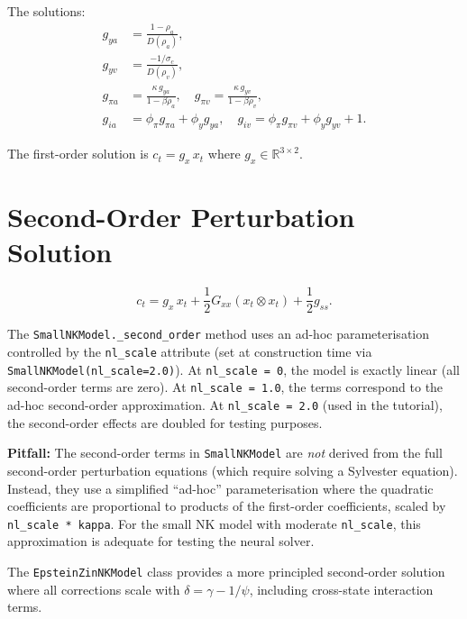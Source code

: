 \documentclass[11pt,a4paper]{article}
\theoremstyle{definition}
\newcommand{\R}{\mathbb{R}}
\newcommand{\code}[1]{\texttt{\color{codecolor}#1}}
\newcommand{\warn}[1]{\textbf{\color{warncolor}Pitfall:} #1}
\begin{document}
	The solutions:
	\begin{align}
		g_{ya} &= \frac{1 - \rho_a}{D(\rho_a)}, \label{eq:gya_solution}\\
		g_{yv} &= \frac{-1/\sigma_c}{D(\rho_v)}, \label{eq:gyv_solution}\\
		g_{\pi a} &= \frac{\kappa \, g_{ya}}{1 - \beta \rho_a}, \quad g_{\pi v} = \frac{\kappa \, g_{yv}}{1 - \beta \rho_v}, \\
		g_{ia} &= \phi_\pi g_{\pi a} + \phi_y g_{ya}, \quad g_{iv} = \phi_\pi g_{\pi v} + \phi_y g_{yv} + 1. \label{eq:giv}
	\end{align}
	
	The first-order solution is $c_t = g_x\, x_t$ where $g_x \in \R^{3\times 2}$.
	
	\section{Second-Order Perturbation Solution}
	\label{sec:perturbation_2}
	
	\begin{equation}\label{eq:second_order}
		c_t = g_x \, x_t + \frac{1}{2} G_{xx} (x_t \otimes x_t) + \frac{1}{2} g_{ss}.
	\end{equation}
	
	The \code{SmallNKModel.\_second\_order} method uses an ad-hoc parameterisation controlled by the \code{nl\_scale} attribute (set at construction time via \code{SmallNKModel(nl\_scale=2.0)}).
	At \code{nl\_scale = 0}, the model is exactly linear (all second-order terms are zero).
	At \code{nl\_scale = 1.0}, the terms correspond to the ad-hoc second-order approximation.
	At \code{nl\_scale = 2.0} (used in the tutorial), the second-order effects are doubled for testing purposes.
	
	\warn{The second-order terms in \code{SmallNKModel} are \emph{not} derived from the full second-order perturbation equations (which require solving a Sylvester equation).
		Instead, they use a simplified ``ad-hoc'' parameterisation where the quadratic coefficients are proportional to products of the first-order coefficients, scaled by \code{nl\_scale * kappa}.
		For the small NK model with moderate \code{nl\_scale}, this approximation is adequate for testing the neural solver.}
	
	The \code{EpsteinZinNKModel} class provides a more principled second-order solution where all corrections scale with $\delta = \gamma - 1/\psi$, including cross-state interaction terms.
\end{document}
